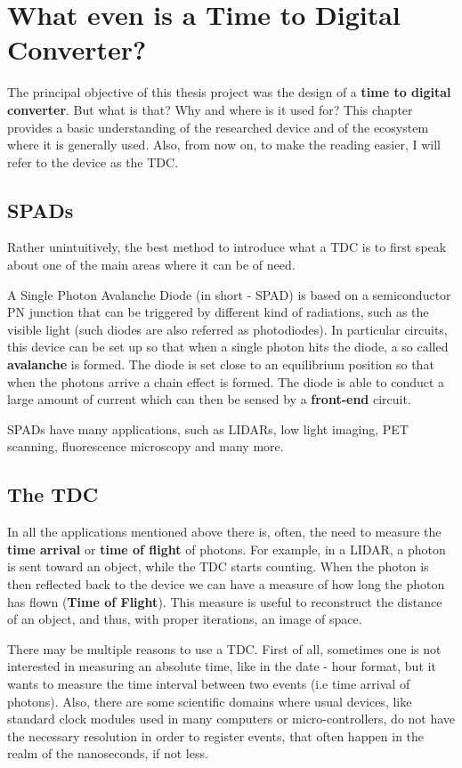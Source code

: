 \chapter{What even is a Time to Digital Converter?}
\label{cha:tdc-intro}
The principal objective of this thesis project was the design of a \textbf{time to digital converter}. But what is that? Why and where is it used for? This chapter provides a basic understanding of the researched device and of the ecosystem where it is generally used. Also, from now on, to make the reading easier, I will refer to the device as the TDC.
 



\section{SPADs}
\label{sec:tdc-spads}
Rather unintuitively, the best method to introduce what a TDC is to first speak about one of the main areas where it can be of need.

A Single Photon Avalanche Diode (in short - SPAD) is based on a semiconductor PN junction that can be triggered by different kind of radiations, such as the visible light (such diodes are also referred as photodiodes). In particular circuits, this device can be set up so that when a single photon hits the diode, a so called \textbf{avalanche} is formed. The diode is set close to an equilibrium position so that when the photons arrive a chain effect is formed. The diode is able to conduct a large amount of current which can then be sensed by a \textbf{front-end} circuit.

SPADs have many applications, such as LIDARs, low light imaging, PET scanning, fluorescence microscopy and many more.


\section{The TDC}
\label{sec:tdc-introduction}
In all the applications mentioned above there is, often, the need to measure the \textbf{time arrival} or \textbf{time of flight} of photons. For example, in a LIDAR, a photon is sent toward an object, while the TDC starts counting. When the photon is then reflected back to the device we can have a measure of how long the photon has flown (\textbf{Time of Flight}). This measure is useful to reconstruct the distance of an object, and thus, with proper iterations, an image of space.

There may be multiple reasons to use a TDC. First of all, sometimes one is not interested in measuring an absolute time, like in the date - hour format, but it wants to measure the time interval between two events (i.e time arrival of photons). Also, there are some scientific domains where usual devices, like standard clock modules used in many computers or micro-controllers, do not have the necessary resolution in order to register events, that often happen in the realm of the nanoseconds, if not less.

